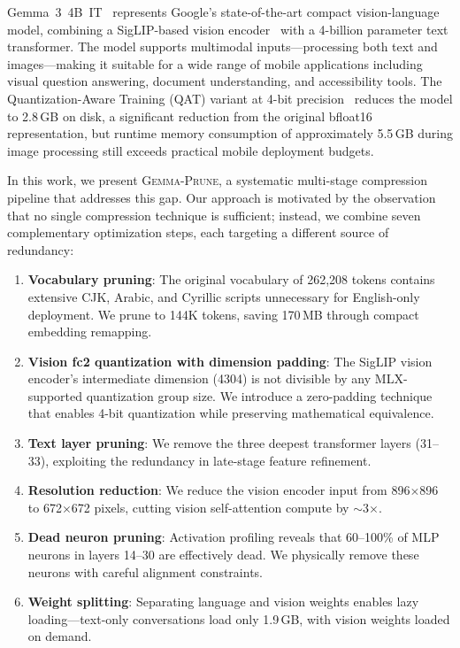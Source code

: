 \documentclass[11pt]{article}
\newcommand{\gemma}{\textsc{Gemma-Prune}}
\begin{document}
Gemma~3~4B~IT~\citep{gemma3} represents Google's state-of-the-art compact vision-language model, combining a SigLIP-based vision encoder~\citep{siglip} with a 4-billion parameter text transformer. The model supports multimodal inputs---processing both text and images---making it suitable for a wide range of mobile applications including visual question answering, document understanding, and accessibility tools. The Quantization-Aware Training (QAT) variant at 4-bit precision~\citep{qat} reduces the model to 2.8\,GB on disk, a significant reduction from the original bfloat16 representation, but runtime memory consumption of approximately 5.5\,GB during image processing still exceeds practical mobile deployment budgets.

In this work, we present \gemma{}, a systematic multi-stage compression pipeline that addresses this gap. Our approach is motivated by the observation that no single compression technique is sufficient; instead, we combine seven complementary optimization steps, each targeting a different source of redundancy:

\begin{enumerate}[leftmargin=*]
    \item \textbf{Vocabulary pruning}: The original vocabulary of 262,208 tokens contains extensive CJK, Arabic, and Cyrillic scripts unnecessary for English-only deployment. We prune to 144K tokens, saving 170\,MB through compact embedding remapping.
    \item \textbf{Vision fc2 quantization with dimension padding}: The SigLIP vision encoder's intermediate dimension (4304) is not divisible by any MLX-supported quantization group size. We introduce a zero-padding technique that enables 4-bit quantization while preserving mathematical equivalence.
    \item \textbf{Text layer pruning}: We remove the three deepest transformer layers (31--33), exploiting the redundancy in late-stage feature refinement.
    \item \textbf{Resolution reduction}: We reduce the vision encoder input from 896$\times$896 to 672$\times$672 pixels, cutting vision self-attention compute by $\sim$3$\times$.
    \item \textbf{Dead neuron pruning}: Activation profiling reveals that 60--100\% of MLP neurons in layers 14--30 are effectively dead. We physically remove these neurons with careful alignment constraints.
    \item \textbf{Weight splitting}: Separating language and vision weights enables lazy loading---text-only conversations load only 1.9\,GB, with vision weights loaded on demand.
\end{enumerate}
\end{document}
